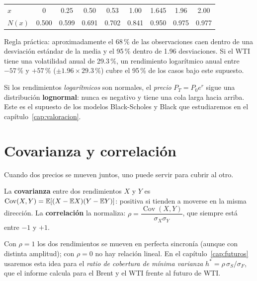 \begin{center}\small
{}
\begin{tabular}{@{}lcccccccc@{}}
\toprule
$x$ & 0 & 0.25 & 0.50 & 0.53 & 1.00 & 1.645 & 1.96 & 2.00\\
$N(x)$ & 0.500 & 0.599 & 0.691 & 0.702 & 0.841 & 0.950 & 0.975 & 0.977\\
\bottomrule
\end{tabular}
\end{center}

Regla práctica: aproximadamente el 68\,\% de las observaciones caen dentro de una desviación estándar de la media y el 95\,\% dentro de 1.96 desviaciones. Si el WTI tiene una volatilidad anual de 29.3\,\%, un rendimiento logarítmico anual entre $-57\,\%$ y $+57\,\%$ ($\pm1.96\times29.3\,\%$) cubre el 95\,\% de los casos bajo este supuesto.

\begin{adicional}[la lognormal]
Si los rendimientos \emph{logarítmicos} son normales, el \emph{precio} $P_T=P_0e^{r}$ sigue una distribución \textbf{lognormal}: nunca es negativo y tiene una cola larga hacia arriba. Este es el supuesto de los modelos Black-Scholes y Black que estudiaremos en el capítulo~\ref{cap:valoracion}.
\end{adicional}

\section{Covarianza y correlación}

Cuando dos precios se mueven juntos, uno puede servir para cubrir al otro.

\begin{definicion}
La \textbf{covarianza} entre dos rendimientos $X$ y $Y$ es $\operatorname{Cov}(X,Y)=\mathbb{E}[(X-\mathbb{E} X)(Y-\mathbb{E} Y)]$: positiva si tienden a moverse en la misma dirección. La \textbf{correlación} la normaliza: $\rho=\dfrac{\operatorname{Cov}(X,Y)}{\sigma_X\sigma_Y}$, que siempre está entre $-1$ y $+1$.
\end{definicion}

Con $\rho=1$ los dos rendimientos se mueven en perfecta sincronía (aunque con distinta amplitud); con $\rho=0$ no hay relación lineal. En el capítulo~\ref{cap:futuros} usaremos esta idea para el \emph{ratio de cobertura de mínima varianza} $h^*=\rho\,\sigma_S/\sigma_F$, que el informe calcula para el Brent y el WTI frente al futuro de WTI.

